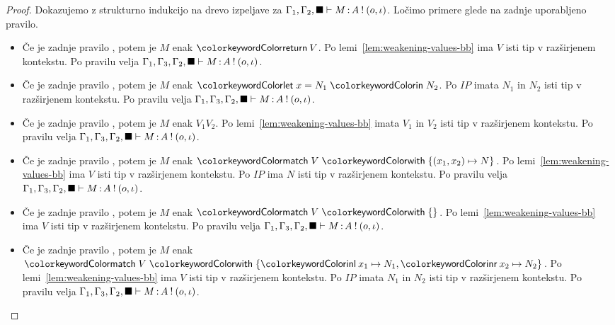 \begin{proof}
	Dokazujemo z strukturno indukcijo na drevo izpeljave za $\Gamma_1, \Gamma_2, \blacksquare \vdash M \mathinner{:} A \mathbin{!} (o, \iota)$.
	Ločimo primere glede na zadnje uporabljeno pravilo.
	
	\begin{itemize}
		\item Če je zadnje pravilo , potem je $M$ enak $\tmreturn{V}$.
		Po lemi~\ref{lem:weakening-values-bb} ima $V$ isti tip v razširjenem kontekstu.
		Po pravilu  velja $\Gamma_1, \Gamma_3, \Gamma_2, \blacksquare \vdash M \mathinner{:} A \mathbin{!} (o, \iota)$.
		
		\item Če je zadnje pravilo , potem je $M$ enak $\tmlet{x}{N_1}{N_2}$.
		Po $IP$ imata $N_1$ in $N_2$ isti tip v razširjenem kontekstu.
		Po pravilu  velja $\Gamma_1, \Gamma_3, \Gamma_2, \blacksquare \vdash M \mathinner{:} A \mathbin{!} (o, \iota)$.
		
		\item Če je zadnje pravilo , potem je $M$ enak $V_1 V_2$.
		Po lemi~\ref{lem:weakening-values-bb} imata $V_1$ in $V_2$ isti tip v razširjenem kontekstu.
		Po pravilu  velja $\Gamma_1, \Gamma_3, \Gamma_2, \blacksquare \vdash M \mathinner{:} A \mathbin{!} (o, \iota)$.
		
		\item Če je zadnje pravilo , potem je $M$ enak $\tmmatch{V}{(x_1,x_2) \mapsto N}$. 
		Po lemi~\ref{lem:weakening-values-bb} ima $V$ isti tip v razširjenem kontekstu.
		Po $IP$ ima $N$ isti tip v razširjenem kontekstu.
		Po pravilu  velja $\Gamma_1, \Gamma_3, \Gamma_2, \blacksquare \vdash M \mathinner{:} A \mathbin{!} (o, \iota)$.
		
		\item Če je zadnje pravilo , potem je $M$ enak $\tmmatch{V}{}$.
		Po lemi~\ref{lem:weakening-values-bb} ima $V$ isti tip v razširjenem kontekstu.
		Po pravilu  velja $\Gamma_1, \Gamma_3, \Gamma_2, \blacksquare \vdash M \mathinner{:} A \mathbin{!} (o, \iota)$.
		
		\item Če je zadnje pravilo , potem je $M$ enak $\tmmatch{V}{\tminl{x_1} \mapsto N_1, \tminr{x_2} \mapsto N_2}$.
		Po lemi~\ref{lem:weakening-values-bb} ima $V$ isti tip v razširjenem kontekstu.
		Po $IP$ imata $N_1$ in $N_2$ isti tip v razširjenem kontekstu.
		Po pravilu  velja $\Gamma_1, \Gamma_3, \Gamma_2, \blacksquare \vdash M \mathinner{:} A \mathbin{!} (o, \iota)$.
		

\end{itemize}
\end{proof}
